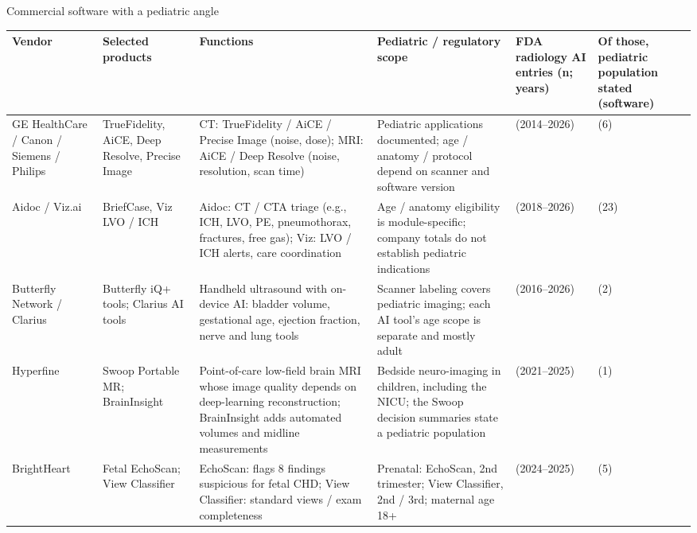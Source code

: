 \documentclass[aspectratio=169]{beamer}
\renewcommand{\arraystretch}{1.08}
\begin{document}
\begin{frame}[category=Commercial Software]{Commercial software with a pediatric angle}
\tiny
\begin{adjustbox}{max totalsize={\textwidth}{0.64\textheight}}
\renewcommand{\arraystretch}{1.2}
\begin{tabular}{|>{\raggedright\arraybackslash}p{}|>{\raggedright\arraybackslash}p{}|>{\raggedright\arraybackslash}p{}|>{\raggedright\arraybackslash}p{}|>{\raggedright\arraybackslash}p{}|>{\raggedright\arraybackslash}p{}|}
\hline \textbf{Vendor} & \textbf{Selected products} & \textbf{Functions} & \textbf{Pediatric / regulatory scope} & \textbf{FDA radiology AI entries (n; years)} & \textbf{Of those, pediatric population stated (software)} \\ \hline
GE HealthCare / Canon / Siemens / Philips & TrueFidelity, AiCE, Deep Resolve, Precise Image & CT: TrueFidelity / AiCE / Precise Image (noise, dose); MRI: AiCE / Deep Resolve (noise, resolution, scan time) & Pediatric applications documented; age / anatomy / protocol depend on scanner and software version & 299 (2014--2026) & 60 (6) \\ \hline
Aidoc / Viz.ai & BriefCase, Viz LVO / ICH & Aidoc: CT / CTA triage (e.g., ICH, LVO, PE, pneumothorax, fractures, free gas); Viz: LVO / ICH alerts, care coordination & Age / anatomy eligibility is module-specific; company totals do not establish pediatric indications & 44 (2018--2026) & 23 (23) \\ \hline
Butterfly Network / Clarius & Butterfly iQ+ tools; Clarius AI tools & Handheld ultrasound with on-device AI: bladder volume, gestational age, ejection fraction, nerve and lung tools & Scanner labeling covers pediatric imaging; each AI tool's age scope is separate and mostly adult & 16 (2016--2026) & 12 (2) \\ \hline
Hyperfine & Swoop Portable MR; BrainInsight & Point-of-care low-field brain MRI whose image quality depends on deep-learning reconstruction; BrainInsight adds automated volumes and midline measurements & Bedside neuro-imaging in children, including the NICU; the Swoop decision summaries state a pediatric population & 13 (2021--2025) & 9 (1) \\ \hline
BrightHeart & Fetal EchoScan; View Classifier & EchoScan: flags 8 findings suspicious for fetal CHD; View Classifier: standard views / exam completeness & Prenatal: EchoScan, 2nd trimester; View Classifier, 2nd / 3rd; maternal age 18+ & 5 (2024--2025) & 5 (5) \\ \hline

\end{tabular}
\end{adjustbox}
\end{frame}
\end{document}

